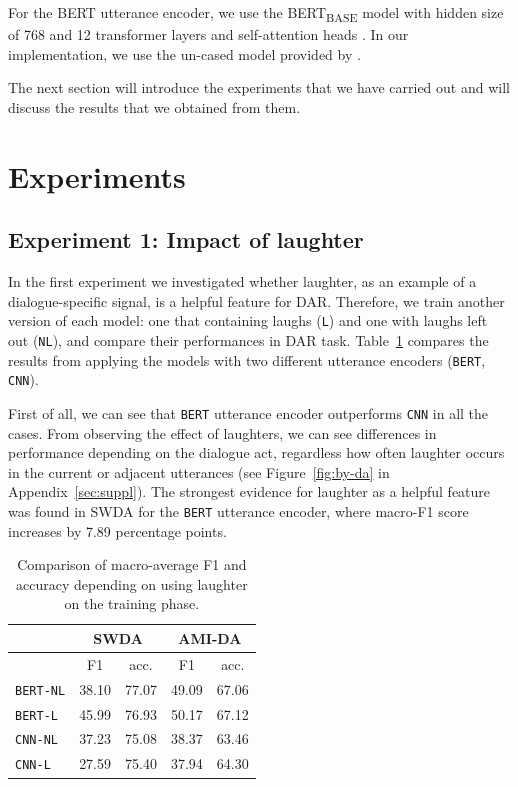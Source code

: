\documentclass[11pt,a4paper]{article}
\begin{document}
For the BERT utterance encoder, we use the BERT\textsubscript{BASE} model with hidden size of 768 and 12 transformer layers and self-attention heads \citep[][\S3.1]{devlinBERTPretrainingDeep2018}.
In our implementation, we use the un-cased model provided by \citet{wolfHuggingFaceTransformersStateoftheart2019}.

The next section will introduce the experiments that we have carried out and will discuss the results that we obtained from them.


\section{Experiments}
\subsection{Experiment 1: Impact of laughter} \label{sec:experiment1}   %
In the first experiment we investigated whether laughter, as an example of a dialogue-specific signal, is a helpful feature for DAR.
Therefore, we train another version of each model: one that containing laughs (\texttt{L}) and one with laughs left out (\texttt{NL}), and compare their performances in DAR task.
Table~\ref{table:laughter-total-acc} compares the results from applying the models with two different utterance encoders (\texttt{BERT}, \texttt{CNN}).

First of all, we can see that \texttt{BERT} utterance encoder outperforms \texttt{CNN} in all the cases.
From observing the effect of laughters, we can see differences in performance depending on the dialogue act, regardless how often laughter occurs in the current or adjacent utterances (see Figure~\ref{fig:by-da} in Appendix~\ref{sec:suppl}).
The strongest evidence for laughter as a helpful feature was found in SWDA for the \texttt{BERT} utterance encoder, where macro-F1 score increases by 7.89 percentage points.

\begin{table}
  \centering
  \begin{tabular}{@{}lcccc@{}}
    \toprule
                      & \multicolumn{2}{c}{SWDA} & \multicolumn{2}{c}{AMI-DA} \\ \midrule
                      & F1    & acc.  & F1    & acc.       \\ 
    \texttt{BERT-NL}  & 38.10 & 77.07 & 49.09 & 67.06       \\ 
    \texttt{BERT-L}   & 45.99 & 76.93 & 50.17 & 67.12       \\ \midrule
    \texttt{CNN-NL}   & 37.23 & 75.08 & 38.37 & 63.46        \\
    \texttt{CNN-L}    & 27.59 & 75.40 & 37.94 & 64.30        \\ \bottomrule
    
  \end{tabular}
  \caption{Comparison of macro-average F1 and accuracy depending on using laughter on the training phase. }
  \label{table:laughter-total-acc}
\end{table}
\end{document}
